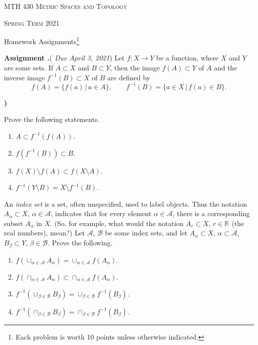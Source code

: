 \documentclass[12pt,reqno]{amsart}
\newcounter{prob}
\newcounter{assign}
\newenvironment{assignment}{\par\noindent\textbf{Assignment \Roman{assign}.\hskip2pt}}{\par\vskip12pt\stepcounter{assign}}
\theoremstyle{plain}
\theoremstyle{definition}
\newcommand{\R}[1]{\mathbb{R}^{#1}}
\begin{document}
\thispagestyle{empty}
\centerline{\large{\scshape{\color{heading} MTH 430 Metric Spaces and Topology}}}
\vskip3pt
\centerline{\large{\scshape{\color{heading} Spring Term 2021}}}
\vskip3pt
\centerline{\large{\ttfamily Homework Assignments\footnote[2]{Each problem is worth 10 points unless otherwise indicated.}}}
\vskip10pt
\begin{assignment}({\em{\color{duecolor} Due April 3, 2021}})
Let $f\colon X\to Y$ be a function, where $X$ and $Y$ are some sets. If $A\subset X$ and $B\subset Y$, then the image $f(A)\subset Y$ of $A$ and the inverse image $f^{-1}(B)\subset X$ of $B$ are defined by 
$$f(A)= \{f(a)\,\vert\, a\in A\},\quad\quad f^{-1}(B) = \{a\in X\,\vert\, f(a)\in B\}.$$
\begin{list}{\textbf{)}}{\setlength{\itemsep}{2pt}\setlength{\leftmargin}{15pt}\setlength{\parsep}{0pt}}
\item 
 Prove the following statements.
\begin{enumerate}[label=\textbf{\alph*})]
\item $A\subset f^{-1}(f(A))$.
\item $f(f^{-1}(B))\subset B$.
\item $f(X)\setminus f(A)\subset f(X\setminus A)$.
\item $f^{-1}(Y\setminus B)=X\setminus f^{-1}(B)$.
\end{enumerate}
\item An \emph{index set} is a set, often unspecified, used to label objects. Thus the notation $A_\alpha\subset X$, $\alpha\in\mathscr A$, indicates that for every element $\alpha\in\mathscr A$, there is a corresponding subset $A_\alpha$ in $X$. (So, for example, what would the notation $A_r\subset X$, $r\in\R{}$ (the real numbers), mean?) 
\vskip3pt
\noindent
Let $\mathscr A$, $\mathscr B$ be some index sets, and let $A_\alpha\subset X$, $\alpha\subset\mathscr A$, $B_\beta\subset Y$, $\beta\in\mathscr B$. Prove the following.
\begin{enumerate}[label=\textbf{\alph*})]
\item $f(\cup_{\alpha\in\mathscr A}A_{\alpha})=\cup_{\alpha\in\mathscr A} f(A_{\alpha})$.
\item $f(\cap_{\alpha\in\mathscr A}A_{\alpha})\subset\cap_{\alpha\in\mathscr A} f(A_{\alpha})$.
\item $f^{-1}(\cup_{\beta\in\mathscr B}B_{\beta})=\cup_{\beta\in\mathscr B} f^{-1}(B_{\beta})$.
\item $f^{-1}(\cap_{\beta\in\mathscr B}B_{\beta})=\cap_{\beta\in\mathscr B} f^{-1}(B_{\beta})$.

\end{enumerate}
\end{list}
\end{assignment}
\end{document}
